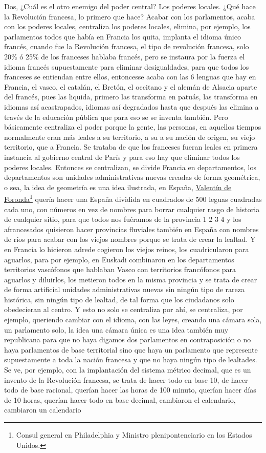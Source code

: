 Dos, ¿Cuál es el otro enemigo del poder central? Los poderes locales. ¿Qué hace la Revolución francesa, lo primero que hace? Acabar con los parlamentos, acaba con los poderes locales, centraliza los poderes locales, elimina, por ejemplo, los parlamentos todos que había en Francia los quita, implanta el idioma único francés, cuando fue la Revolución francesa, el tipo de revolución francesa, solo 20\% ó 25\% de los franceses hablaba francés, pero se instaura por la fuerza el idioma francés supuestamente para eliminar desigualdades, para que todos los franceses se entiendan entre ellos, entoncesse acaba con las 6 lenguas que hay en Francia, el vasco, el catalán, el Bretón, el occitano y el alemán de Alsacia aparte del francés, pues las liquida, primero las transforma en patuás, las transforma en idiomas así acastrapados, idiomas así degradados hasta que después las elimina a través de la educación pública que para eso se se inventa también. Pero básicamente centraliza el poder porque la gente, las personas, en aquellos tiempos normalmente eran más leales a su territorio, a su a su nación de origen, su viejo territorio, que a Francia. Se trataba de que los franceses fueran leales en primera instancia al gobierno central de París y para eso hay que eliminar todos los poderes locales. Entonces se centralizan, se divide Francia en departamentos, los departamentos son unidades administrativas nuevas creadas de forma geométrica, o sea, la idea de geometría es una idea ilustrada, en España, \href{https://en.wikipedia.org/wiki/Valentin_de_Foronda}{Valentín de Foronda}\footnote{Consul general en Philadelphia y Ministro plenipontenciario en los Estados Unidos.} quería hacer una España dividida en cuadrados de 500 leguas cuadradas cada uno, con números en vez de nombres para borrar cualquier rasgo de historia de cualquier sitio, para que todos nos fuéramos de la provincia 1 2 3 4 y los afrancesados quisieron hacer provincias fluviales también en España con nombres de ríos para acabar con los viejos nombres porque se trata de crear la lealtad. Y en Francia lo hicieron adrede cogieron los viejos reinos, los cuadricularon para aguarlos, para por ejemplo, en Euskadi combinaron en los departamentos territorios vascófonos que hablaban Vasco con territorios francófonos para aguarlos y diluirlos, los metieron todos en la misma provincia y se trata de crear de forma artificial unidades administrativas nuevas sin ningún tipo de rareza histórica, sin ningún tipo de lealtad, de tal forma que los ciudadanos solo obedecieran al centro. Y esto no solo se centraliza por ahí, se centraliza, por ejemplo, queriendo cambiar con el idioma, con las leyes, creando una cámara sola, un parlamento solo, la idea una cámara única es una idea también muy republicana para que no haya digamos dos parlamentos en contraposición o no haya parlamentos de base territorial sino que haya  un parlamento que represente supuestamente a toda la nación francesa y que no haya ningún tipo de lealtades. Se ve, por ejemplo, con la implantación del sistema métrico decimal, que es un invento de la Revolución francesa, se trata de hacer todo en base 10, de hacer todo de base racional, querían hacer las horas de 100 minuto, querían hacer días de 10 horas, querían hacer todo en base decimal, cambiaron el calendario, cambiaron un calendario 